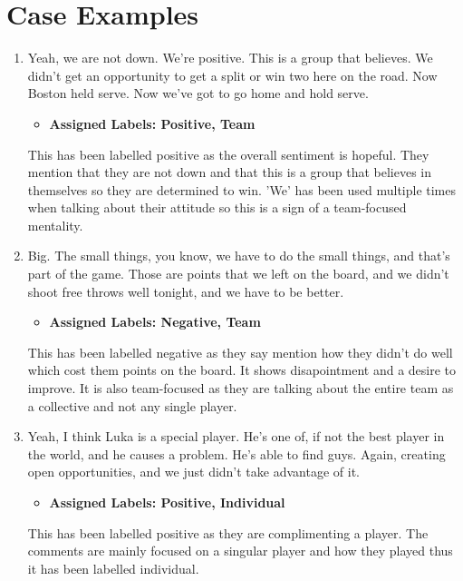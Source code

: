 \documentclass[titlepage]{article}
\begin{document}
\section{Case Examples}
\begin{enumerate}
    \item Yeah, we are not down. We're positive. This is a group that believes. We didn't get an opportunity to get a 
    split or win two here on the road. Now Boston held serve. Now we've got to go home and hold serve.
    \begin{itemize}
        \item \textbf{Assigned Labels: Positive, Team}
    \end{itemize}
    This has been labelled positive as the overall sentiment is hopeful. They mention that they are not down and that this is 
    a group that believes in themselves so they are determined to win. 'We' has been used multiple times when talking about 
    their attitude so this is a sign of a team-focused mentality.

    \item Big. The small things, you know, we have to do the small things, and that's part of the game. Those are points 
    that we left on the board, and we didn't shoot free throws well tonight, and we have to be better.
    \begin{itemize}
        \item \textbf{Assigned Labels: Negative, Team}
    \end{itemize}
    This has been labelled negative as they say mention how they didn't do well which cost them points on the board. It shows 
    disapointment and a desire to improve. It is also team-focused as they are talking about the entire team as a collective 
    and not any single player.

    \item Yeah, I think Luka is a special player. He's one of, if not the best player in the world, and he causes a problem. 
    He's able to find guys. Again, creating open opportunities, and we just didn't take advantage of it.
    \begin{itemize}
        \item \textbf{Assigned Labels: Positive, Individual}
    \end{itemize}
    This has been labelled positive as they are complimenting a player. The comments are mainly focused on a singular player 
    and how they played thus it has been labelled individual.
\end{enumerate}
\end{document}
